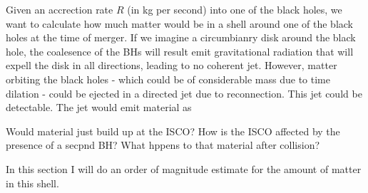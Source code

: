 \documentclass{article}
\begin{document}
Given an accrection rate $R$ (in kg per second) into one of the black holes, we want to calculate how much matter would be in a shell around one of the black holes at the time of merger. If we imagine a circumbianry disk around the black hole, the coalesence of the BHs will result emit gravitational radiation that will expell the disk in all directions, leading to no coherent jet. However, matter orbiting the black holes - which could be of considerable mass due to time dilation - could be ejected in a directed jet due to reconnection. This jet could be detectable. The jet would emit material as 

Would material just build up at the ISCO? How is the ISCO affected by the presence of a secpnd BH? What hppens to that material after collision?


In this section I will do an order of magnitude estimate for the amount of matter in this shell.



\end{document}
